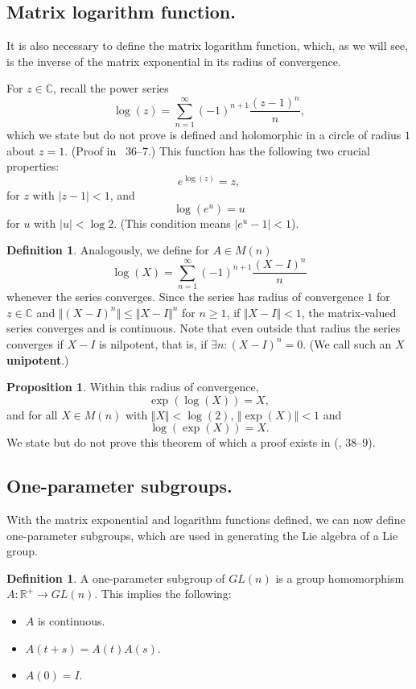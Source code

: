 \documentclass[12pt]{article}
\newcommand{\C}{\mathbb{C}}
\newcommand{\R}{\mathbb{R}}
\newcommand{\V}{\Vert}
\theoremstyle{definition}
\newtheorem{prop}[them]{Proposition}
\theoremstyle{definition}
\theoremstyle{definition}
\theoremstyle{definition}
\theoremstyle{definition}
\newtheorem{defn}[them]{Definition}
\theoremstyle{definition}
\theoremstyle{definition}
\theoremstyle{definition}
\begin{document}
\subsection{Matrix logarithm function.}
\par{It is also necessary to define the matrix logarithm function, which, as we will see, is the inverse of the matrix exponential in its radius of convergence.}
\par{For $z \in \C$, recall the power series
\[
    \log(z) = \sum_{n=1}^{\infty} {(-1)}^{n+1} \frac{{(z-1)}^n}{n},
\] which we state but do not prove is defined and holomorphic in a circle of radius $1$ about $z = 1$. (Proof in~\cite{Hall} 36--7.) This function has the following two crucial properties:
\[
    e^{\log(z)} = z,
\] for $z$ with $\vert z - 1 \vert < 1$, and
\[
    \log(e^u) = u
\] for $u$ with $\vert u \vert < \log2$. (This condition means $\vert e^u - 1\vert < 1$).
}
\begin{defn}
Analogously, we define for $A \in M(n)$
\[
    \log(X) = \sum_{n=1}^{\infty}{(-1)}^{n+1}\frac{{(X-I)}^n}{n}
\] whenever the series converges. Since the series has 
radius of convergence $1$ for $z \in \C$ and $\V
{(X-I)}^n \V \leq \V X-I \V^n$ for $n \geq 1$, if
$\V X - I \V < 1$, the matrix-valued series
converges and is continuous. Note that even
outside that radius the series converges if $X-I$
is nilpotent, that is, if $\exists n : {(X-I)}^n = 0$.
(We call such an $X$
\textbf{unipotent}.)\end{defn}
\begin{prop} 
Within this radius of convergence,
\[
    \exp(\log(X)) = X,
\] and for all $X \in M(n)$ with $\V X \V < \log(2)$, $\V \exp(X) \V < 1$ and
\[
    \log(\exp(X)) = X.
\] We state but do not prove this theorem of which a proof exists in (\cite{Hall}, 38--9).
\end{prop}

\subsection{One-parameter subgroups.}
\par{With the matrix exponential and logarithm functions defined, we can now define one-parameter subgroups, which are used in generating the Lie algebra of a Lie group.}
\begin{defn}\label{def:gh}
A one-parameter subgroup of $GL(n)$ is a group homomorphism $A: \R^{+} \to
GL(n)$. This implies the following: 
\begin{itemize}
    \item $A$ is continuous.
    \item $A(t+s) = A(t)A(s)$.
    \item $A(0) = I$.
\end{itemize}
\end{defn}
\end{document}
